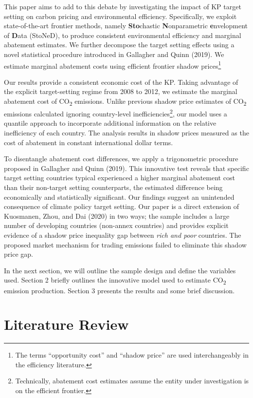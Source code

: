 \documentclass[
  10pt,
]{article}
\begin{document}
This paper aims to add to this debate by investigating the impact of KP
target setting on carbon pricing and environmental efficiency.
Specifically, we exploit state-of-the-art frontier methods, namely
\textbf{Sto}chastic \textbf{N}onparametric \textbf{e}nvelopment of
\textbf{D}ata (StoNeD), to produce consistent environmental efficiency
and marginal abatement estimates. We further decompose the target
setting effects using a novel statistical procedure introduced in
Gallagher and Quinn (2019). We estimate marginal abatement costs using
efficient frontier shadow prices\footnote{The terms ``opportunity cost''
  and ``shadow price'' are used interchangeably in the efficiency
  literature.}

Our results provide a consistent economic cost of the KP. Taking
advantage of the explicit target-setting regime from 2008 to 2012, we
estimate the marginal abatement cost of CO\textsubscript{2} emissions.
Unlike previous shadow price estimates of CO\textsubscript{2} emissions
calculated ignoring country-level inefficiencies\footnote{Technically,
  abatement cost estimates assume the entity under investigation is on
  the efficient frontier.}, our model uses a quantile approach to
incorporate additional information on the relative inefficiency of each
country. The analysis results in shadow prices measured as the cost of
abatement in constant international dollar terms.

To disentangle abatement cost differences, we apply a trigonometric
procedure proposed in Gallagher and Quinn (2019). This innovative test
reveals that specific target setting countries typical experienced a
higher marginal abatement cost than their non-target setting
counterparts, the estimated difference being economically and
statistically significant. Our findings suggest an unintended
consequence of climate policy target setting. Our paper is a direct
extension of Kuosmanen, Zhou, and Dai (2020) in two ways; the sample
includes a large number of developing countries (non-annex countries)
and provides explicit evidence of a shadow price inequality gap between
\emph{rich and poor} countries. The proposed market mechanism for
trading emissions failed to eliminate this shadow price gap.

In the next section, we will outline the sample design and define the
variables used. Section 2 briefly outlines the innovative model used to
estimate CO\textsubscript{2} emission production. Section 3 presents the
results and some brief discussion.

\hypertarget{literature-review}{%
\section{Literature Review}\label{literature-review}}
\end{document}
